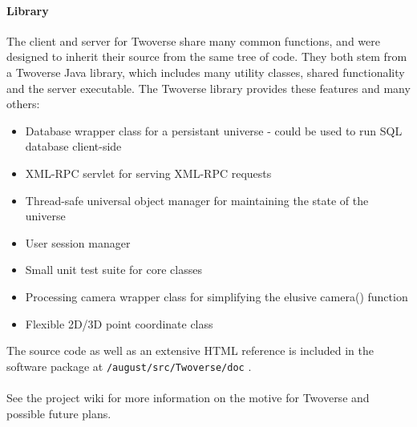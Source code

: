 \paragraph{Library}
The client and server for Twoverse share many common functions, and were designed to inherit their source from the same tree of code. They both stem from a Twoverse Java library, which includes many utility classes, shared functionality and the server executable. The Twoverse library provides these features and many others:
\begin{itemize}
\item Database wrapper class for a persistant universe - could be used to run SQL database client-side
\item XML-RPC servlet for serving XML-RPC requests
\item Thread-safe universal object manager for maintaining the state of the universe
\item User session manager
\item Small unit test suite for core classes
\item Processing camera wrapper class for simplifying the elusive camera() function
\item Flexible 2D/3D point coordinate class
\end{itemize}
The source code as well as an extensive HTML reference is included in the software package at \texttt{/august/src/Twoverse/doc} \cite{PACK}.
\paragraph{}
See the project wiki \cite{WIKI} for more information on the motive for Twoverse and possible future plans.

